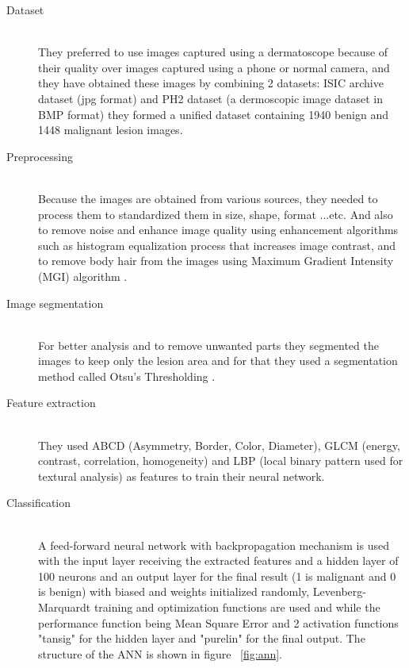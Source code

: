     \begin{description}
    \item [Dataset] \hfill \\
    They preferred to use images captured using a dermatoscope because of their quality over images captured using a phone or normal camera, and they have obtained these images by combining 2 datasets: ISIC archive dataset (jpg format) and PH2 dataset (a dermoscopic image dataset in BMP format) they formed a unified dataset containing 1940 benign and 1448 malignant lesion images.

    \item [Preprocessing] \hfill \\
    Because the images are obtained from various sources, they needed to process them to standardized them in size, shape, format ...etc.
    And also to remove noise and enhance image quality using enhancement algorithms such as histogram equalization process that increases image contrast, and to remove body hair from the images using Maximum Gradient Intensity (MGI) algorithm .

    \item [Image segmentation] \hfill \\
    For better analysis and to remove unwanted parts they segmented the images to keep only the lesion area and for that they used a segmentation method called Otsu's Thresholding .

    \item [Feature extraction] \hfill \\
    They used ABCD (Asymmetry, Border, Color, Diameter), GLCM (energy, contrast, correlation, homogeneity) and LBP (local binary pattern used for textural analysis) as features to train their neural network.

    \item [Classification] \hfill \\
        A feed-forward neural network with backpropagation mechanism is used with the input layer receiving the extracted features and a hidden layer of 100 neurons and an output layer for the final result (1 is malignant and 0 is benign) with biased and weights initialized randomly, Levenberg-Marquardt training and optimization functions are used and while the performance function being Mean Square Error and 2 activation functions "tansig" for the hidden layer and "purelin" for the final output.
        The structure of the ANN is shown in figure ~\ref{fig:ann}.
    

\end{description}
